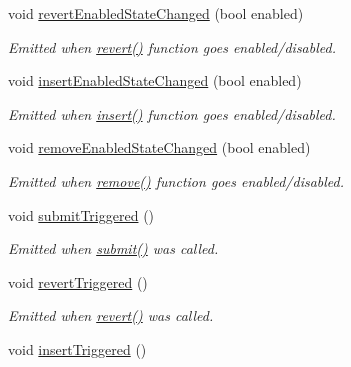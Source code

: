 \begin{DoxyCompactItemize}
void \hyperlink{classmdt_abstract_sql_widget_ada899f0c3f8388d2d3feac7c0c50884c}{revertEnabledStateChanged} (bool enabled)
\begin{DoxyCompactList}\small\item\em Emitted when \hyperlink{classmdt_abstract_sql_widget_a3108b336f4c832cb0a5b3a830fff9ce0}{revert()} function goes enabled/disabled. \end{DoxyCompactList}\item 
void \hyperlink{classmdt_abstract_sql_widget_a909ba5b675f596ee5c5980e159cd2878}{insertEnabledStateChanged} (bool enabled)
\begin{DoxyCompactList}\small\item\em Emitted when \hyperlink{classmdt_abstract_sql_widget_a850df045ea95b8c15ddd95ae771ef785}{insert()} function goes enabled/disabled. \end{DoxyCompactList}\item 
void \hyperlink{classmdt_abstract_sql_widget_a9c536f5081b321e8df24316506fc19f3}{removeEnabledStateChanged} (bool enabled)
\begin{DoxyCompactList}\small\item\em Emitted when \hyperlink{classmdt_abstract_sql_widget_a748f85ff383d3f11fda4db7f931edb1c}{remove()} function goes enabled/disabled. \end{DoxyCompactList}\item 
\hypertarget{classmdt_abstract_sql_widget_ab3bee735c32de34c0b097f1a426bafca}{
void \hyperlink{classmdt_abstract_sql_widget_ab3bee735c32de34c0b097f1a426bafca}{submitTriggered} ()}
\label{classmdt_abstract_sql_widget_ab3bee735c32de34c0b097f1a426bafca}

\begin{DoxyCompactList}\small\item\em Emitted when \hyperlink{classmdt_abstract_sql_widget_a6678c45b0d46eb163f5b09d79ed001b5}{submit()} was called. \end{DoxyCompactList}\item 
\hypertarget{classmdt_abstract_sql_widget_a4cd4617364c875c6c777cff1ce0187ae}{
void \hyperlink{classmdt_abstract_sql_widget_a4cd4617364c875c6c777cff1ce0187ae}{revertTriggered} ()}
\label{classmdt_abstract_sql_widget_a4cd4617364c875c6c777cff1ce0187ae}

\begin{DoxyCompactList}\small\item\em Emitted when \hyperlink{classmdt_abstract_sql_widget_a3108b336f4c832cb0a5b3a830fff9ce0}{revert()} was called. \end{DoxyCompactList}\item 
\hypertarget{classmdt_abstract_sql_widget_a87ca4a74a2d8073be3ae92d7215eb538}{
void \hyperlink{classmdt_abstract_sql_widget_a87ca4a74a2d8073be3ae92d7215eb538}{insertTriggered} ()}
\label{classmdt_abstract_sql_widget_a87ca4a74a2d8073be3ae92d7215eb538}


\end{DoxyCompactItemize}

